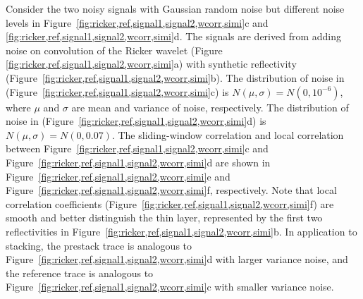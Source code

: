Consider the two noisy signals with Gaussian random noise but different noise 
levels in Figure~\ref{fig:ricker,ref,signal1,signal2,wcorr,simi}c and 
\ref{fig:ricker,ref,signal1,signal2,wcorr,simi}d. The signals are derived from 
adding noise on convolution of the Ricker wavelet (Figure
\ref{fig:ricker,ref,signal1,signal2,wcorr,simi}a)
with synthetic reflectivity 
(Figure~\ref{fig:ricker,ref,signal1,signal2,wcorr,simi}b). The distribution of 
noise in 
(Figure~\ref{fig:ricker,ref,signal1,signal2,wcorr,simi}c) is 
$N(\mu,\sigma)=N(0,10^{-6})$, where $\mu$ and $\sigma$ 
are mean and variance of noise, respectively. The distribution of noise in 
(Figure~\ref{fig:ricker,ref,signal1,signal2,wcorr,simi}d) is 
$N(\mu,\sigma)=N(0,0.07)$. The sliding-window 
correlation and local correlation
between Figure~\ref{fig:ricker,ref,signal1,signal2,wcorr,simi}c and 
Figure~\ref{fig:ricker,ref,signal1,signal2,wcorr,simi}d are shown in 
Figure~\ref{fig:ricker,ref,signal1,signal2,wcorr,simi}e and 
Figure~\ref{fig:ricker,ref,signal1,signal2,wcorr,simi}f, respectively.
Note that local correlation coefficients 
(Figure~\ref{fig:ricker,ref,signal1,signal2,wcorr,simi}f) are smooth and
better distinguish the thin layer, represented by the first two reflectivities
in Figure~\ref{fig:ricker,ref,signal1,signal2,wcorr,simi}b. In application to 
stacking, the prestack trace is
analogous to Figure~\ref{fig:ricker,ref,signal1,signal2,wcorr,simi}d with 
larger variance noise, and the reference trace is analogous to 
Figure~\ref{fig:ricker,ref,signal1,signal2,wcorr,simi}c with smaller variance 
noise.

